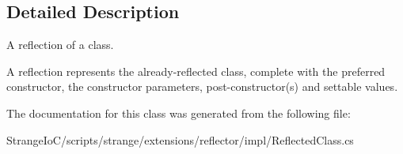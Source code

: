 \subsection{Detailed Description}
A reflection of a class. 

A reflection represents the already-\/reflected class, complete with the preferred constructor, the constructor parameters, post-\/constructor(s) and settable values. 

The documentation for this class was generated from the following file\-:\begin{DoxyCompactItemize}
\item 
Strange\-Io\-C/scripts/strange/extensions/reflector/impl/Reflected\-Class.\-cs\end{DoxyCompactItemize}
